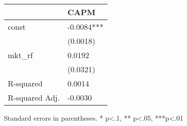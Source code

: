 \begin{table}
\caption{}
\label{}
\begin{center}
\begin{tabular}{ll}
\hline
               & CAPM        \\
\hline
const          & -0.0084***  \\
               & (0.0018)    \\
mkt\_rf        & 0.0192      \\
               & (0.0321)    \\
R-squared      & 0.0014      \\
R-squared Adj. & -0.0030     \\
\hline
\end{tabular}
\end{center}
\end{table}
\bigskip
Standard errors in parentheses. \newline 
* p<.1, ** p<.05, ***p<.01